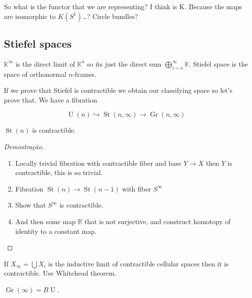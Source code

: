 So what is the functor that we are representing? I think is K. Because the maps are isomorphic to  $K(S^1)$…? Circle bundles?

\subsection{Stiefel spaces}

\begin{defn}
	$\mathbb{K}^\infty$ is the direct limit of $\mathbb{K}^n$ so its just the direct sum $\bigoplus_{i=n}^\infty\mathbb{K} $. Stiefel space is the space of orthonormal $n$-frames.
\end{defn}

If we prove that Stiefel is contractible we obtain our classifying space so let's prove that. We have a fibration

\[\operatorname{U}(n)\hookrightarrow \operatorname{St}(n,\infty)\to \operatorname{Gr}(n,\infty)\]

\begin{thm}
	$\operatorname{St}(n)$ is contractible.
\end{thm}

\begin{proof}[Demostra\c c\~ao]
	\begin{enumerate}[label=\textbf{Step \arabic*}]
		\item Locally trivial fibration with contractible fiber and base $Y\to X$ then $Y$ is contractible, this is so trivial.

		\item Fibration $ \operatorname{St}(n)\to \operatorname{St}(n-1)$ with fiber $S^\infty$ 

		\item Show that $S^\infty$ is contractible.

		\item And then some map $\mathbb{R}$ that is not surjective, and construct homotopy of identity to a constant map.
	\end{enumerate}
\end{proof}

\begin{exercise}
	If $X_{\infty}=\bigcup X_{i} $ is the inductive limit of contractible cellular spaces then it is contractible. Use Whitehead theorem.
\end{exercise}

\begin{thm}[Important]\leavevmode
	$\operatorname{Gr}(\infty)=B\operatorname{U}$.
\end{thm}

